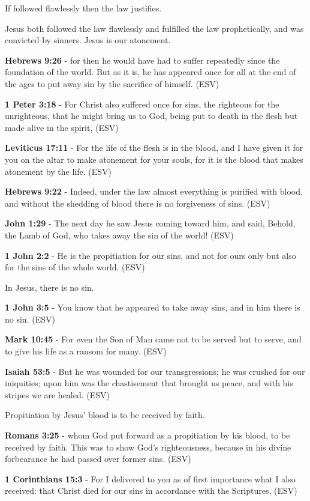 \documentclass[11pt]{article}
\begin{document}
If followed flawlessly then the law justifies.

Jesus both followed the law flawlessly and fulfilled the law prophetically, and was convicted by sinners. Jesus is our atonement.

\textbf{Hebrews 9:26} - for then he would have had to suffer repeatedly since the foundation of the world.  But as it is, he has appeared once for all at the end of the ages to put away sin by the sacrifice of himself.  (ESV)

\textbf{1 Peter 3:18} - For Christ also suffered once for sins, the righteous for the unrighteous, that he might bring us to God, being put to death in the flesh but made alive in the spirit,  (ESV)

\textbf{Leviticus 17:11} - For the life of the flesh is in the blood, and I have given it for you on the altar to make atonement for your souls, for it is the blood that makes atonement by the life.  (ESV)

\textbf{Hebrews 9:22} - Indeed, under the law almost everything is purified with blood, and without the shedding of blood there is no forgiveness of sins.  (ESV)

\textbf{John 1:29} - The next day he saw Jesus coming toward him, and said, Behold, the Lamb of God, who takes away the sin of the world!  (ESV)

\textbf{1 John 2:2} - He is the propitiation for our sins, and not for ours only but also for the sins of the whole world.  (ESV)

In Jesus, there is no sin.

\textbf{1 John 3:5} - You know that he appeared to take away sins, and in him there is no sin.  (ESV)

\textbf{Mark 10:45} -  For even the Son of Man came not to be served but to serve, and to give his life as a ransom for many.  (ESV)

\textbf{Isaiah 53:5} -  But he was wounded for our transgressions; he was crushed for our iniquities; upon him was the chastisement that brought us peace, and with his stripes we are healed.  (ESV)

Propitiation by Jesus' blood is to be received by faith.

\textbf{Romans 3:25} -  whom God put forward as a propitiation by his blood, to be received by faith.  This was to show God's righteousness, because in his divine forbearance he had passed over former sins.  (ESV)

\textbf{1 Corinthians 15:3} -  For I delivered to you as of first importance what I also received: that Christ died for our sins in accordance with the Scriptures,  (ESV)
\end{document}
